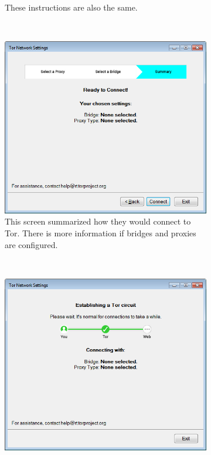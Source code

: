 \documentclass[USenglish,oneside,twocolumn]{article}
\begin{document}
\begin{figure}
\begin{subfigure}[b]{0.30\textwidth}
	\centering\captionsetup{width=1.5\linewidth}%
	\caption{These instructions are also the same.}
	\label{fig:new-bridge-help}
\end{subfigure}
~~~~~~~~~~
\begin{subfigure}[b]{0.30\textwidth}
	\includegraphics[width=\textwidth]{screenshots/NEW-summary.png}
	\centering\captionsetup{width=1.5\linewidth}%
	\caption{This screen summarized how they would connect to Tor. There is more information if bridges and proxies are configured.}
	\label{fig:new-summary}
\end{subfigure}
~~~~~~~~~~~~~~~~~~~~~~~~~
\begin{subfigure}[b]{0.30\textwidth}
	\includegraphics[width=\textwidth]{screenshots/NEW-progress.png}

\end{subfigure}
\end{figure}
\end{document}
